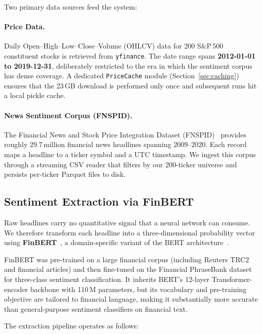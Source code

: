 Two primary data sources feed the system:

\paragraph{Price Data.}
Daily Open--High--Low--Close--Volume (OHLCV) data for 200 S\&P\,500 constituent
stocks is retrieved from \texttt{yfinance}.  The date range spans
\textbf{2012-01-01 to 2019-12-31}, deliberately restricted to the era in which
the sentiment corpus has dense coverage.  A dedicated \texttt{PriceCache} module
(Section~\ref{sec:caching}) ensures that the 23\,GB download is performed only
once and subsequent runs hit a local pickle cache.

\paragraph{News Sentiment Corpus (FNSPID).}
The Financial News and Stock Price Integration Dataset
(FNSPID)~\cite{fnspid2024} provides roughly 29.7\,million financial news
headlines spanning 2009--2020.  Each record maps a headline to a ticker symbol
and a UTC timestamp.  We ingest this corpus through a streaming CSV reader that
filters by our 200-ticker universe and persists per-ticker Parquet files to
disk.

\subsection{Sentiment Extraction via FinBERT}
\label{sec:finbert}

Raw headlines carry no quantitative signal that a neural network can consume.
We therefore transform each headline into a three-dimensional probability vector
using \textbf{FinBERT}~\cite{finbert2019}, a domain-specific variant of the BERT
architecture~\cite{devlin2019bert}.

FinBERT was pre-trained on a large financial corpus (including Reuters TRC2 and
financial articles) and then fine-tuned on the Financial PhraseBank dataset for
three-class sentiment classification.  It inherits BERT's 12-layer
Transformer-encoder backbone with 110\,M parameters, but its vocabulary and
pre-training objective are tailored to financial language, making it
substantially more accurate than general-purpose sentiment classifiers on
financial text.

The extraction pipeline operates as follows:

